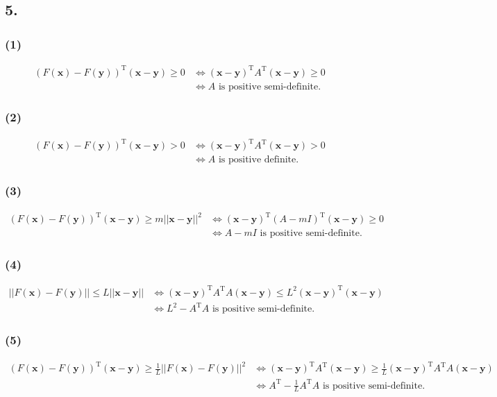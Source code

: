 \documentclass{article}
\begin{document}
\subsection*{5.}
\subsubsection*{(1)}
\begin{align*}
(F(\bm{x})-F(\bm{y}))^{\mathrm{T}}(\bm{x}-\bm{y})\geq0&\Leftrightarrow (\bm{x}-\bm{y})^{\mathrm{T}}A^{\mathrm{T}}(\bm{x}-\bm{y})\geq0\\
&\Leftrightarrow A \text{ is positive semi-definite.}
\end{align*}
\subsubsection*{(2)}
\begin{align*}
(F(\bm{x})-F(\bm{y}))^{\mathrm{T}}(\bm{x}-\bm{y})>0&\Leftrightarrow (\bm{x}-\bm{y})^{\mathrm{T}}A^{\mathrm{T}}(\bm{x}-\bm{y})>0\\
&\Leftrightarrow A \text{ is positive definite.}
\end{align*}
\subsubsection*{(3)}
\begin{align*}
(F(\bm{x})-F(\bm{y}))^{\mathrm{T}}(\bm{x}-\bm{y})\geq m||\bm{x}-\bm{y}||^{2}&\Leftrightarrow (\bm{x}-\bm{y})^{\mathrm{T}}(A-mI)^{\mathrm{T}}(\bm{x}-\bm{y})\geq0\\
&\Leftrightarrow A-mI \text{ is positive semi-definite.}
\end{align*}
\subsubsection*{(4)}
\begin{align*}
||F(\bm{x})-F(\bm{y})||\leq L||\bm{x}-\bm{y}||&\Leftrightarrow (\bm{x}-\bm{y})^{\mathrm{T}}A^{\mathrm{T}}A(\bm{x}-\bm{y})\leq L^{2}(\bm{x}-\bm{y})^{\mathrm{T}}(\bm{x}-\bm{y})\\
&\Leftrightarrow L^{2}-A^{\mathrm{T}}A \text{ is positive semi-definite.}
\end{align*}
\subsubsection*{(5)}
\begin{align*}
(F(\bm{x})-F(\bm{y}))^{\mathrm{T}}(\bm{x}-\bm{y})\geq\frac{1}{L}||F(\bm{x})-F(\bm{y})||^{2}&\Leftrightarrow (\bm{x}-\bm{y})^{\mathrm{T}}A^{\mathrm{T}}(\bm{x}-\bm{y})\geq \frac{1}{L}(\bm{x}-\bm{y})^{\mathrm{T}}A^{\mathrm{T}}A(\bm{x}-\bm{y})\\
&\Leftrightarrow A^{\mathrm{T}}-\frac{1}{L}A^{\mathrm{T}}A \text{ is positive semi-definite.}
\end{align*}
\end{document}
